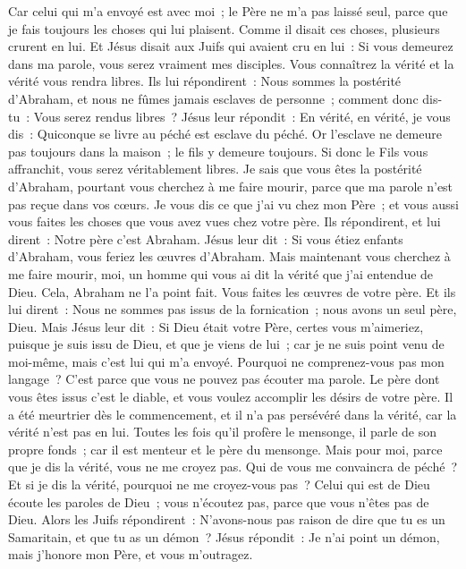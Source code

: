 \begin{multicols}{2}
Car celui qui m'a envoyé est avec moi~; le Père ne m'a pas laissé seul, parce que je fais toujours les choses qui lui plaisent.
Comme il disait ces choses, plusieurs crurent en lui.
Et Jésus disait aux Juifs qui avaient cru en lui~: Si vous demeurez dans ma parole, vous serez vraiment mes disciples.
Vous connaîtrez la vérité et la vérité vous rendra libres.
Ils lui répondirent~: Nous sommes la postérité d'Abraham, et nous ne fûmes jamais esclaves de personne~; comment donc dis-tu~: Vous serez rendus libres~?
Jésus leur répondit~: En vérité, en vérité, je vous dis~: Quiconque se livre au péché est esclave du péché.
Or l'esclave ne demeure pas toujours dans la maison~; le fils y demeure toujours.
Si donc le Fils vous affranchit, vous serez véritablement libres.
Je sais que vous êtes la postérité d'Abraham, pourtant vous cherchez à me faire mourir, parce que ma parole n'est pas reçue dans vos cœurs.
Je vous dis ce que j'ai vu chez mon Père~; et vous aussi vous faites les choses que vous avez vues chez votre père.
Ils répondirent, et lui dirent~: Notre père c'est Abraham. Jésus leur dit~: Si vous étiez enfants d'Abraham, vous feriez les œuvres d'Abraham.
Mais maintenant vous cherchez à me faire mourir, moi, un homme qui vous ai dit la vérité que j'ai entendue de Dieu. Cela, Abraham ne l'a point fait.
Vous faites les œuvres de votre père. Et ils lui dirent~: Nous ne sommes pas issus de la fornication~; nous avons un seul père, Dieu.
Mais Jésus leur dit~: Si Dieu était votre Père, certes vous m'aimeriez, puisque je suis issu de Dieu, et que je viens de lui~; car je ne suis point venu de moi-même, mais c'est lui qui m'a envoyé.
Pourquoi ne comprenez-vous pas mon langage~? C'est parce que vous ne pouvez pas écouter ma parole.
Le père dont vous êtes issus c'est le diable, et vous voulez accomplir les désirs de votre père. Il a été meurtrier dès le commencement, et il n'a pas persévéré dans la vérité, car la vérité n'est pas en lui. Toutes les fois qu'il profère le mensonge, il parle de son propre fonds~; car il est menteur et le père du mensonge.
Mais pour moi, parce que je dis la vérité, vous ne me croyez pas.
Qui de vous me convaincra de péché~? Et si je dis la vérité, pourquoi ne me croyez-vous pas~?
Celui qui est de Dieu écoute les paroles de Dieu~; vous n'écoutez pas, parce que vous n'êtes pas de Dieu.
Alors les Juifs répondirent~: N'avons-nous pas raison de dire que tu es un Samaritain, et que tu as un démon~?
Jésus répondit~: Je n'ai point un démon, mais j'honore mon Père, et vous m'outragez.

\end{multicols}
